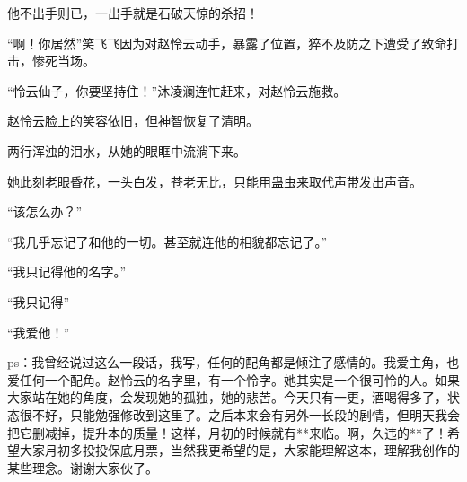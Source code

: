 \begin{this_body}
他不出手则已，一出手就是石破天惊的杀招！

“啊！你居然”笑飞飞因为对赵怜云动手，暴露了位置，猝不及防之下遭受了致命打击，惨死当场。

“怜云仙子，你要坚持住！”沐凌澜连忙赶来，对赵怜云施救。

赵怜云脸上的笑容依旧，但神智恢复了清明。

两行浑浊的泪水，从她的眼眶中流淌下来。

她此刻老眼昏花，一头白发，苍老无比，只能用蛊虫来取代声带发出声音。

“该怎么办？”

“我几乎忘记了和他的一切。甚至就连他的相貌都忘记了。”

“我只记得他的名字。”

“我只记得”

“我爱他！”

ps：我曾经说过这么一段话，我写，任何的配角都是倾注了感情的。我爱主角，也爱任何一个配角。赵怜云的名字里，有一个怜字。她其实是一个很可怜的人。如果大家站在她的角度，会发现她的孤独，她的悲苦。今天只有一更，酒喝得多了，状态很不好，只能勉强修改到这里了。之后本来会有另外一长段的剧情，但明天我会把它删减掉，提升本的质量！这样，月初的时候就有**来临。啊，久违的**了！希望大家月初多投投保底月票，当然我更希望的是，大家能理解这本，理解我创作的某些理念。谢谢大家伙了。

\end{this_body}

